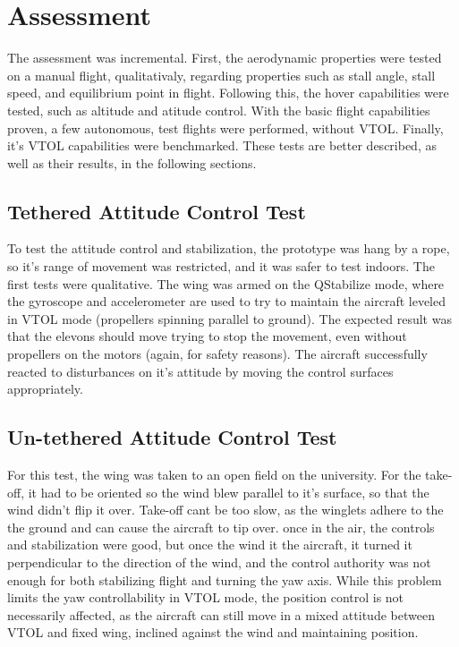 \chapter{Assessment} \label{chap:assessment}

The assessment was incremental. First, the aerodynamic properties were tested on a manual flight, qualitativaly, regarding properties such as stall angle, stall speed, and equilibrium point in flight. Following this, the hover capabilities were tested, such as altitude and atitude control. With the basic flight capabilities proven, a few autonomous, test flights were performed, without VTOL. Finally, it's VTOL capabilities were benchmarked. These tests are better described, as well as their results, in the following sections.


\section{Tethered Attitude Control Test}

To test the attitude control and stabilization, the prototype was hang by a rope, so it's range of movement was restricted, and it was safer to test indoors.
%
The first tests were qualitative. The wing was armed on the QStabilize mode, where the gyroscope and accelerometer are used to try to maintain the aircraft leveled in VTOL mode (propellers spinning parallel to ground).
%
The expected result was that the elevons should move trying to stop the movement, even without propellers on the motors (again, for safety reasons).
%
The aircraft successfully reacted to disturbances on it's attitude by moving the control surfaces appropriately.


\section{Un-tethered Attitude Control Test} 

For this test, the wing was taken to an open field on the university.
%
For the take-off, it had to be oriented so the wind blew parallel to it's surface, so that the wind didn't flip it over.
%
Take-off cant be too slow, as the winglets adhere to the the ground and can cause the aircraft to tip over.
%
once in the air, the controls and stabilization were good, but once the wind it the aircraft, it turned it perpendicular to the direction of the wind, and the control authority was not enough for both stabilizing flight and turning the yaw axis.
%
While this problem limits the yaw controllability in VTOL mode, the position control is not necessarily affected, as the aircraft can still move in a mixed attitude between VTOL and fixed wing, inclined against the wind and maintaining position.
%

